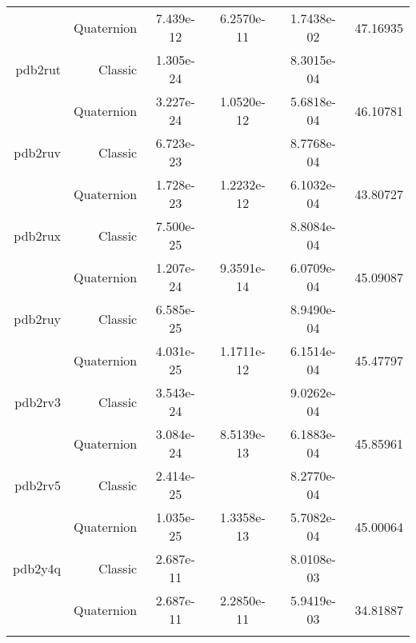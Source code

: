 \begin{xltabular}{\textwidth}{r|rS[table-format=1.3e+2]S[table-format=1.4e+2]S[table-format=1.4e+2]S[table-format=-1.5]}
& Quaternion & 7.439e-12 & 6.2570e-11 & 1.7438e-02 & 47.16935\\  \addlinespace
pdb2rut & Classic & 1.305e-24 &  & 8.3015e-04 & \\
& Quaternion & 3.227e-24 & 1.0520e-12 & 5.6818e-04 & 46.10781\\  \addlinespace
pdb2ruv & Classic & 6.723e-23 &  & 8.7768e-04 & \\
& Quaternion & 1.728e-23 & 1.2232e-12 & 6.1032e-04 & 43.80727\\  \addlinespace
pdb2rux & Classic & 7.500e-25 &  & 8.8084e-04 & \\
& Quaternion & 1.207e-24 & 9.3591e-14 & 6.0709e-04 & 45.09087\\  \addlinespace
pdb2ruy & Classic & 6.585e-25 &  & 8.9490e-04 & \\
& Quaternion & 4.031e-25 & 1.1711e-12 & 6.1514e-04 & 45.47797\\  \addlinespace
pdb2rv3 & Classic & 3.543e-24 &  & 9.0262e-04 & \\
& Quaternion & 3.084e-24 & 8.5139e-13 & 6.1883e-04 & 45.85961\\  \addlinespace
pdb2rv5 & Classic & 2.414e-25 &  & 8.2770e-04 & \\
& Quaternion & 1.035e-25 & 1.3358e-13 & 5.7082e-04 & 45.00064\\  \addlinespace
pdb2y4q & Classic & 2.687e-11 &  & 8.0108e-03 & \\
& Quaternion & 2.687e-11 & 2.2850e-11 & 5.9419e-03 & 34.81887\\  \addlinespace
\end{xltabular}
